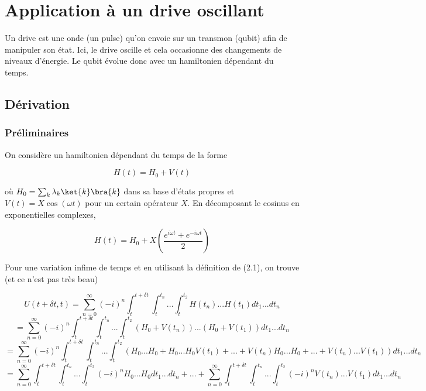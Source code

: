 \newpage
\section{Application à un drive oscillant}
Un drive est une onde (un pulse) qu'on envoie sur un transmon (qubit) afin de manipuler son état. Ici, le drive oscille et cela occasionne des changements de niveaux d'énergie. Le qubit évolue donc avec un hamiltonien dépendant du temps.

\subsection{Dérivation}

\subsubsection{Préliminaires}
On considère un hamiltonien dépendant du temps de la forme 

\begin{equation}
    H(t) = H_0 + V(t)
\end{equation}

où $H_0 = \sum_{k} \lambda_k \ket{k}\bra{k}$ dans sa base d'états propres et $V(t) = X\cos(\omega t)$ pour un certain opérateur $X$. En décomposant le cosinus en exponentielles complexes, 

\begin{equation*}
    H(t) = H_0 + X\left(\frac{e^{i \omega t} + e^{-i\omega t}}{2}\right)
\end{equation*}

Pour une variation infime de temps et en utilisant la définition de (2.1), on trouve (et ce n'est pas très beau)

\begin{equation*}
    U(t+\delta t, t) = \sum_{n=0}^{\infty} (-i)^n \int_{t}^{t+\delta t}\int_{t}^{t_n}...\int_{t}^{t_2}H(t_n)...H(t_1)dt_1 ... dt_n
\end{equation*}
\begin{equation*}
    = \sum_{n=0}^{\infty} (-i)^n \int_{t}^{t+\delta t}\int_{t}^{t_n}...\int_{t}^{t_2}\left(H_0 + 
    V(t_n)\right)...\left(H_0 + V(t_1)\right)dt_1 ... dt_n
\end{equation*}
\begin{equation*}
    = \sum_{n=0}^{\infty} (-i)^n \int_{t}^{t+\delta t}\int_{t}^{t_n}...\int_{t}^{t_2} \left(H_0...H_0 + H_0...H_0V(t_1) + ... + V(t_n)H_0...H_0 + ... + V(t_n)...V(t_1)\right)dt_1 ... dt_n
\end{equation*}
\begin{equation}
    = \sum_{n=0}^{\infty} \int_{t}^{t+\delta t}\int_{t}^{t_n}...\int_{t}^{t_2} (-i)^n H_0...H_0 dt_1...dt_n + ... + \sum_{n=0}^{\infty} \int_{t}^{t+\delta t}\int_{t}^{t_n}...\int_{t}^{t_2}(-i)^n V(t_n)...V(t_1) dt_1...dt_n
\end{equation}


